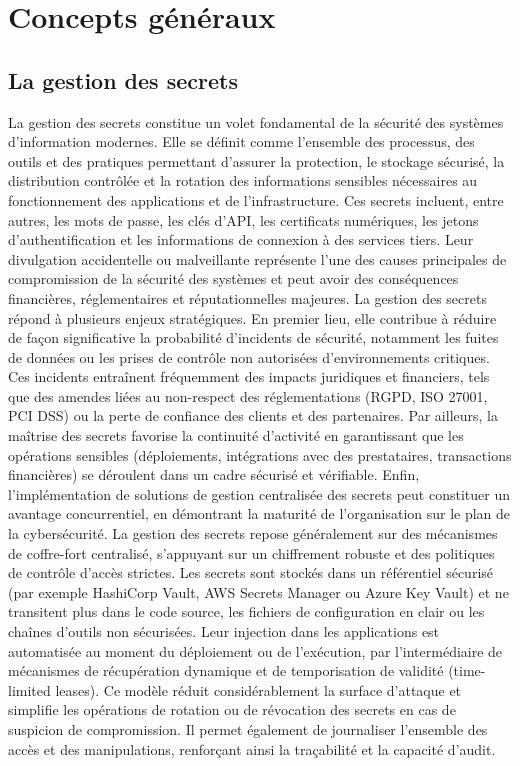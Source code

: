 \section{Concepts généraux}

\subsection{La gestion des secrets}

La gestion des secrets constitue un volet fondamental de la sécurité des systèmes d’information modernes. Elle se définit comme l’ensemble des processus, des outils et des pratiques permettant d’assurer la protection, le stockage sécurisé, la distribution contrôlée et la rotation des informations sensibles nécessaires au fonctionnement des applications et de l’infrastructure. Ces secrets incluent, entre autres, les mots de passe, les clés d’API, les certificats numériques, les jetons d’authentification et les informations de connexion à des services tiers. Leur divulgation accidentelle ou malveillante représente l’une des causes principales de compromission de la sécurité des systèmes et peut avoir des conséquences financières, réglementaires et réputationnelles majeures.
La gestion des secrets répond à plusieurs enjeux stratégiques. En premier lieu, elle contribue à réduire de façon significative la probabilité d’incidents de sécurité, notamment les fuites de données ou les prises de contrôle non autorisées d’environnements critiques. Ces incidents entraînent fréquemment des impacts juridiques et financiers, tels que des amendes liées au non-respect des réglementations (RGPD, ISO 27001, PCI DSS) ou la perte de confiance des clients et des partenaires. Par ailleurs, la maîtrise des secrets favorise la continuité d’activité en garantissant que les opérations sensibles (déploiements, intégrations avec des prestataires, transactions financières) se déroulent dans un cadre sécurisé et vérifiable. Enfin, l’implémentation de solutions de gestion centralisée des secrets peut constituer un avantage concurrentiel, en démontrant la maturité de l’organisation sur le plan de la cybersécurité.
La gestion des secrets repose généralement sur des mécanismes de coffre-fort centralisé, s’appuyant sur un chiffrement robuste et des politiques de contrôle d’accès strictes. Les secrets sont stockés dans un référentiel sécurisé (par exemple HashiCorp Vault, AWS Secrets Manager ou Azure Key Vault) et ne transitent plus dans le code source, les fichiers de configuration en clair ou les chaînes d’outils non sécurisées. Leur injection dans les applications est automatisée au moment du déploiement ou de l’exécution, par l’intermédiaire de mécanismes de récupération dynamique et de temporisation de validité (time-limited leases). Ce modèle réduit considérablement la surface d’attaque et simplifie les opérations de rotation ou de révocation des secrets en cas de suspicion de compromission. Il permet également de journaliser l’ensemble des accès et des manipulations, renforçant ainsi la traçabilité et la capacité d’audit.

